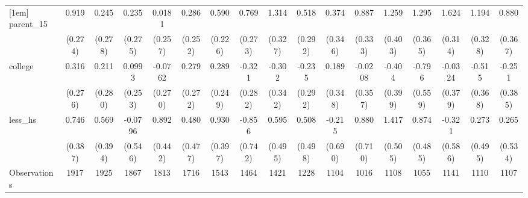 {\begin{tabular}{l*{16}{c}}
[1em]
parent\_15           &       0.919\sym{***}&       0.245         &       0.235         &      0.0181         &       0.286         &       0.590\sym{**} &       0.769\sym{**} &       1.314\sym{***}&       0.518         &       0.374         &       0.887\sym{**} &       1.259\sym{**} &       1.295\sym{***}&       1.624\sym{***}&       1.194\sym{***}&       0.880\sym{*}  \\
                    &     (0.274)         &     (0.278)         &     (0.275)         &     (0.257)         &     (0.252)         &     (0.226)         &     (0.273)         &     (0.327)         &     (0.292)         &     (0.346)         &     (0.333)         &     (0.403)         &     (0.365)         &     (0.314)         &     (0.328)         &     (0.367)         \\
[1em]
college             &       0.316         &       0.211         &      0.0993         &     -0.0762         &       0.279         &       0.289         &      -0.321         &      -0.302         &      -0.235         &       0.189         &     -0.0208         &      -0.404         &      -0.796         &     -0.0324         &      -0.515         &      -0.251         \\
                    &     (0.276)         &     (0.280)         &     (0.253)         &     (0.270)         &     (0.272)         &     (0.249)         &     (0.282)         &     (0.342)         &     (0.292)         &     (0.348)         &     (0.357)         &     (0.399)         &     (0.559)         &     (0.379)         &     (0.368)         &     (0.385)         \\
[1em]
less\_hs             &       0.746         &       0.569         &     -0.0796         &       0.892\sym{*}  &       0.480         &       0.930\sym{*}  &      -0.856         &       0.595         &       0.508         &      -0.215         &       0.880         &       1.417\sym{**} &       0.874         &      -0.321         &       0.273         &       0.265         \\
                    &     (0.387)         &     (0.394)         &     (0.546)         &     (0.442)         &     (0.477)         &     (0.397)         &     (0.742)         &     (0.495)         &     (0.498)         &     (0.690)         &     (0.710)         &     (0.505)         &     (0.485)         &     (0.586)         &     (0.495)         &     (0.534)         \\
\hline
Observations        &        1917         &        1925         &        1867         &        1813         &        1716         &        1543         &        1464         &        1421         &        1228         &        1104         &        1016         &        1108         &        1055         &        1141         &        1110         &        1107         \\

\end{tabular}}
